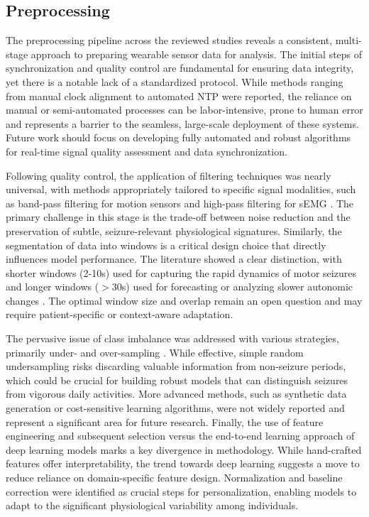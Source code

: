 \subsection{Preprocessing}
The preprocessing pipeline across the reviewed studies reveals a consistent, multi-stage approach to preparing wearable sensor data for analysis. The initial steps of synchronization and quality control are fundamental for ensuring data integrity, yet there is a notable lack of a standardized protocol. While methods ranging from manual clock alignment \cite{Yu2023-ss} to automated NTP \cite{Vakilna2024-hk} were reported, the reliance on manual or semi-automated processes can be labor-intensive, prone to human error and represents a barrier to the seamless, large-scale deployment of these systems. Future work should focus on developing fully automated and robust algorithms for real-time signal quality assessment and data synchronization.

Following quality control, the application of filtering techniques was nearly universal, with methods appropriately tailored to specific signal modalities, such as band-pass filtering for motion sensors \cite{Wu2024-yl, De_Cooman2018-pq} and high-pass filtering for sEMG \cite{Milosevic2016-ee}. The primary challenge in this stage is the trade-off between noise reduction and the preservation of subtle, seizure-relevant physiological signatures. Similarly, the segmentation of data into windows is a critical design choice that directly influences model performance. The literature showed a clear distinction, with shorter windows (2-10s) used for capturing the rapid dynamics of motor seizures \cite{Milosevic2016-ee, Larsen2024-vn} and longer windows ($>$30s) used for forecasting or analyzing slower autonomic changes \cite{Meisel2020-ii, Jiang2022-zu}. The optimal window size and overlap remain an open question and may require patient-specific or context-aware adaptation.

The pervasive issue of class imbalance was addressed with various strategies, primarily under- and over-sampling \cite{Yu2023-ss, Tang2021-td, Larsen2024-vn}. While effective, simple random undersampling risks discarding valuable information from non-seizure periods, which could be crucial for building robust models that can distinguish seizures from vigorous daily activities. More advanced methods, such as synthetic data generation or cost-sensitive learning algorithms, were not widely reported and represent a significant area for future research. Finally, the use of feature engineering and subsequent selection \cite{Ge2023-ab, Xu2022-tx} versus the end-to-end learning approach of deep learning models marks a key divergence in methodology. While hand-crafted features offer interpretability, the trend towards deep learning suggests a move to reduce reliance on domain-specific feature design. Normalization and baseline correction \cite{Jiang2022-zu, Nasseri2021-xn} were identified as crucial steps for personalization, enabling models to adapt to the significant physiological variability among individuals.

